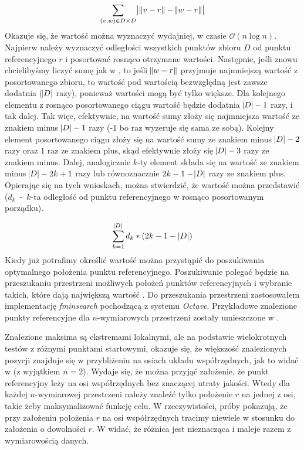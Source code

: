 \begin{equation}
	\sum_{(v,w) \in D \times D}\abs{\,\norm{v-r} - \norm{w-r}}
	\label{ti:cartesian-sum}
\end{equation}
Okazuje się, że wartość  można wyznaczyć wydajniej, w czasie $ \mathcal{O}(n\log{n}) $. Najpierw należy wyznaczyć odległości wszystkich punktów zbioru $ D $ od punktu referencyjnego $ r $ i posortować rosnąco otrzymane wartości. Następnie, jeśli znowu chcielibyśmy liczyć sumę jak w , to jeśli $ \norm{w-r} $ przyjmuje najmniejszą wartość z posortowanego zbioru, to wartość pod wartością bezwzględną jest zawsze dodatnia ($ \abs{D} $ razy), ponieważ wartości  mogą być tylko większe. Dla kolejnego elementu z rosnąco posortowanego ciągu wartość będzie dodatnia $ \abs{D}-1 $ razy, i tak dalej. Tak więc, efektywnie, na wartość sumy złoży się najmniejsza wartość ze znakiem minus $ \abs{D}-1 $ razy (-1 bo raz wyzeruje się sama ze sobą). Kolejny element posortowanego ciągu złoży się na wartość sumy ze znakiem minus $ \abs{D}-2 $ razy oraz $ 1 $ raz ze znakiem plus, skąd efektywnie złoży się $ \abs{D}-3 $ razy ze znakiem minus. Dalej, analogicznie $ k $-ty element składa się na wartość  ze znakiem minus $ \abs{D} - 2k + 1 $ razy lub równoznacznie $ 2k-1-\abs{D} $ razy ze znakiem plus. Opierając się na tych wnioskach, można stwierdzić, że wartość  można przedstawić  (\mbox{$ d_k $ - $ k $-ta} odległość od punktu referencyjnego w rosnąco posortowanym porządku).

\begin{equation}
	\sum_{k=1}^{\abs{D}}d_k*(2k-1-|D|)
	\label{ti:eff-max-ti-d}
\end{equation}
Kiedy już potrafimy określić wartość  można przystąpić do poszukiwania optymalnego położenia punktu referencyjnego. Poszukiwanie polegać będzie na przeszukaniu przestrzeni możliwych położeń punktów referencyjnych i wybranie takich, które dają największą wartość . Do przeszukania przestrzeni zastosowałem implementację \textit{fminsearch} pochodzącą z systemu \textit{Octave}. Przykładowe znalezione punkty referencyjne dla $ n $-wymiarowych przestrzeni zostały umieszczone w .

Znalezione maksima są ekstremami lokalnymi, ale na podstawie wielokrotnych testów z różnymi punktami startowymi, okazuje się, że większość znalezionych pozycji znajduje się w przybliżeniu na osiach układu współrzędnych, jak to widać w  (z wyjątkiem $ n=2 $). Wydaje się, że można przyjąć założenie, że punkt referencyjny leży na osi współrzędnych bez znaczącej utraty jakości. Wtedy dla każdej $ n $-wymiarowej przestrzeni należy znaleźć tylko położenie $ r $ na jednej z osi, takie żeby maksymalizować funkcję celu. W rzeczywistości, próby pokazują, że przy założeniu położenia $ r $ na osi współrzędnych tracimy niewiele w stosunku do założenia o dowolności $ r $. W  widać, że różnica jest nieznacząca i maleje razem z wymiarowością danych.

